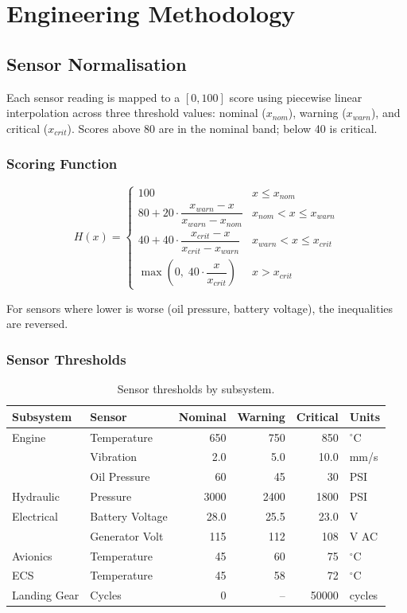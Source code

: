 \documentclass[11pt, a4paper]{report}
\begin{document}
\chapter{Engineering Methodology}
\label{ch:methodology}

\section{Sensor Normalisation}

Each sensor reading is mapped to a $[0, 100]$ score using piecewise linear
interpolation across three threshold values: nominal ($x_{nom}$), warning
($x_{warn}$), and critical ($x_{crit}$). Scores above 80 are in the nominal
band; below 40 is critical.

\subsection{Scoring Function}

\[
H(x) =
\begin{cases}
100 & x \leq x_{nom} \\[4pt]
80 + 20 \cdot \dfrac{x_{warn} - x}{x_{warn} - x_{nom}} & x_{nom} < x \leq x_{warn} \\[8pt]
40 + 40 \cdot \dfrac{x_{crit} - x}{x_{crit} - x_{warn}} & x_{warn} < x \leq x_{crit} \\[8pt]
\max\!\left(0,\; 40 \cdot \dfrac{x}{x_{crit}}\right) & x > x_{crit}
\end{cases}
\]

For sensors where lower is worse (oil pressure, battery voltage), the
inequalities are reversed.

\subsection{Sensor Thresholds}

\begin{table}[h!]
\centering
\begin{tabular}{@{}llrrrl@{}}
\toprule
\textbf{Subsystem} & \textbf{Sensor} & \textbf{Nominal} & \textbf{Warning} & \textbf{Critical} & \textbf{Units} \\
\midrule
Engine      & Temperature    & 650  & 750  & 850  & $^\circ$C \\
            & Vibration      & 2.0  & 5.0  & 10.0 & mm/s \\
            & Oil Pressure   & 60   & 45   & 30   & PSI \\
Hydraulic   & Pressure       & 3000 & 2400 & 1800 & PSI \\
Electrical  & Battery Voltage& 28.0 & 25.5 & 23.0 & V \\
            & Generator Volt & 115  & 112  & 108  & V AC \\
Avionics    & Temperature    & 45   & 60   & 75   & $^\circ$C \\
ECS         & Temperature    & 45   & 58   & 72   & $^\circ$C \\
Landing Gear& Cycles         & 0    & --   & 50000& cycles \\
\bottomrule
\end{tabular}
\caption{Sensor thresholds by subsystem.}
\end{table}
\end{document}
